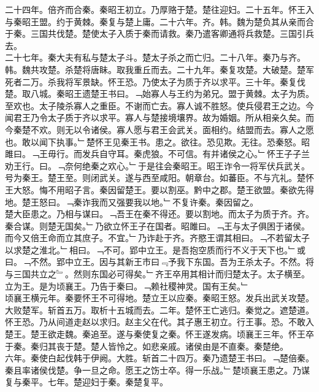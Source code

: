 \documentclass{zhvt-classic}
\begin{document}
\hspace*{2em}二十四年。倍齐而合秦。秦昭王初立。乃厚赂于楚。楚往迎妇。二十五年。怀王入与秦昭王盟。约于黄棘。秦复与楚上庸。二十六年。齐。韩。魏为楚负其从亲而合于秦。三国共伐楚。楚使太子入质于秦而请救。秦乃遣客卿通将兵救楚。三国引兵去。\\
\hspace*{2em}二十七年。秦大夫有私与楚太子斗。楚太子杀之而亡归。二十八年。秦乃与齐。韩。魏共攻楚。杀楚将唐眛。取我重丘而去。二十九年。秦复攻楚。大破楚。楚军死者二万。杀我将军景缺。怀王恐。乃使太子为质于齐以求平。三十年。秦复伐楚。取八城。秦昭王遗楚王书曰。﹁始寡人与王约为弟兄。盟于黄棘。太子为质。至欢也。太子陵杀寡人之重臣。不谢而亡去。寡人诚不胜怒。使兵侵君王之边。今闻君王乃令太子质于齐以求平。寡人与楚接境壤界。故为婚姻。所从相亲久矣。而今秦楚不欢。则无以令诸侯。寡人愿与君王会武关。面相约。结盟而去。寡人之愿也。敢以闻下执事。﹂楚怀王见秦王书。患之。欲往。恐见欺。无往。恐秦怒。昭雎曰。﹁王毋行。而发兵自守耳。秦虎狼。不可信。有并诸侯之心。﹂怀王子子兰劝王行。曰。﹁奈何绝秦之欢心。﹂于是往会秦昭王。昭王诈令一将军伏兵武关。号为秦王。楚王至。则闭武关。遂与西至咸阳。朝章台。如蕃臣。不与亢礼。楚怀王大怒。悔不用昭子言。秦因留楚王。要以割巫。黔中之郡。楚王欲盟。秦欲先得地。楚王怒曰。﹁秦诈我而又强要我以地。﹂不复许秦。秦因留之。\\
\hspace*{2em}楚大臣患之。乃相与谋曰。﹁吾王在秦不得还。要以割地。而太子为质于齐。齐。秦合谋。则楚无国矣。﹂乃欲立怀王子在国者。昭雎曰。﹁王与太子俱困于诸侯。而今又倍王命而立其庶子。不宜。﹂乃诈赴于齐。齐愍王谓其相曰。﹁不若留太子以求楚之淮北。﹂相曰。﹁不可。郢中立王。是吾抱空质而行不义于天下也。﹂或曰。﹁不然。郢中立王。因与其新王市曰﹃予我下东国。吾为王杀太子。不然。将与三国共立之﹄。然则东国必可得矣。﹂齐王卒用其相计而归楚太子。太子横至。立为王。是为顷襄王。乃告于秦曰。﹁赖社稷神灵。国有王矣。﹂\\
\hspace*{2em}顷襄王横元年。秦要怀王不可得地。楚立王以应秦。秦昭王怒。发兵出武关攻楚。大败楚军。斩首五万。取析十五城而去。二年。楚怀王亡逃归。秦觉之。遮楚道。怀王恐。乃从间道走赵以求归。赵主父在代。其子惠王初立。行王事。恐。不敢入楚王。楚王欲走魏。秦追至。遂与秦使复之秦。怀王遂发病。顷襄王三年。怀王卒于秦。秦归其丧于楚。楚人皆怜之。如悲亲戚。诸侯由是不直秦。秦楚绝。\\
\hspace*{2em}六年。秦使白起伐韩于伊阙。大胜。斩首二十四万。秦乃遗楚王书曰。﹁楚倍秦。秦且率诸侯伐楚。争一旦之命。愿王之饬士卒。得一乐战。﹂楚顷襄王患之。乃谋复与秦平。七年。楚迎妇于秦。秦楚复平。\\
\end{document}
